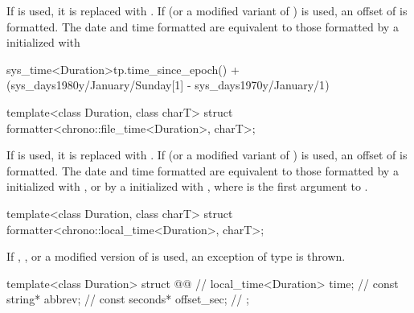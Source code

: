 \begin{itemdescr}
\pnum
\remarks
If  is used,
it is replaced with .
If  (or a modified variant of ) is used,
an offset of  is formatted.
The date and time formatted are equivalent to
those formatted by a  initialized with
\begin{codeblock}
sys_time<Duration>{tp.time_since_epoch()} +
  (sys_days{1980y/January/Sunday[1]} - sys_days{1970y/January/1})
\end{codeblock}
\end{itemdescr}

%
\begin{itemdecl}
template<class Duration, class charT>
  struct formatter<chrono::file_time<Duration>, charT>;
\end{itemdecl}

\begin{itemdescr}
\pnum
\remarks
If  is used,
it is replaced with .
If  (or a modified variant of ) is used,
an offset of  is formatted.
The date and time formatted are equivalent to
those formatted
by a  initialized with , or
by a  initialized with ,
where  is the first argument to .
\end{itemdescr}

%
\begin{itemdecl}
template<class Duration, class charT>
  struct formatter<chrono::local_time<Duration>, charT>;
\end{itemdecl}

\begin{itemdescr}
\pnum
\remarks
If , , or a modified version of  is used,
an exception of type  is thrown.
\end{itemdescr}

%
\begin{codeblock}
template<class Duration> struct @@ {           // \expos
  local_time<Duration> time;                                    // \expos
  const string* abbrev;                                         // \expos
  const seconds* offset_sec;                                    // \expos
};
\end{codeblock}

